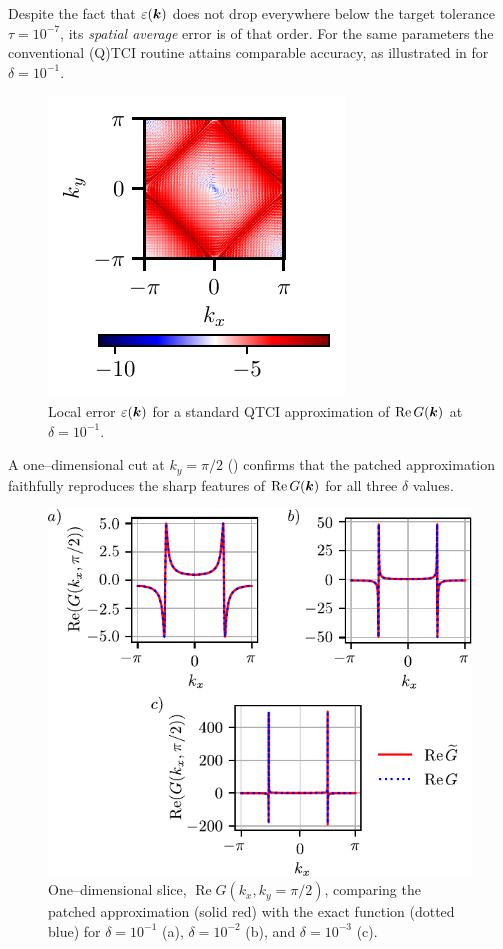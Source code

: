 Despite the fact that \(\varepsilon(\boldsymbol{k})\) does not drop everywhere below the target tolerance \(\tau=10^{-7}\), its \emph{spatial average} error is of that
order. For the same parameters the conventional (Q)TCI routine attains comparable accuracy, as illustrated in  for
\(\delta=10^{-1}\).
\begin{figure}[ht!]
    \centering
    \includegraphics{figures/heatmap_TCI_error_2DGreen_ω_0.1_δ_0.1_R_15_abstol_1.0e-7_unfol_fused.pdf}
    \caption{Local error \(\varepsilon(\boldsymbol{k})\) for a standard QTCI approximation of \(\operatorname{Re}G(\boldsymbol{k})\) at \(\delta=10^{-1}\).}
    \label{fig:TCI2DGreenerror}
\end{figure}

A one–dimensional cut at \(k_{y}=\pi/2\) () confirms that the patched approximation faithfully reproduces the sharp features of \(\operatorname{Re}G(\boldsymbol{k})\) for all three
\(\delta\) values.
\begin{figure}[ht!]
    \centering
    \includegraphics{figures/lineError2DGreen.pdf}
    \caption{One–dimensional slice,
           \(\operatorname{Re}G(k_{x},k_{y}=\pi/2)\),
           comparing the patched approximation (solid red) with the exact
           function (dotted blue) for
           \(\delta=10^{-1}\) (a),
           \(\delta=10^{-2}\) (b),
           and \(\delta=10^{-3}\) (c).}
    \label{fig:lineError2DGreen}
\end{figure}


